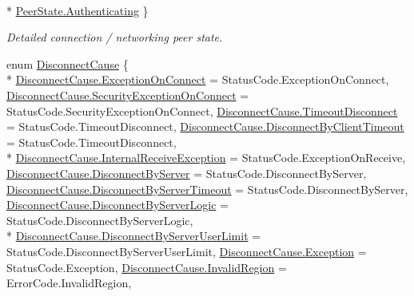 \begin{DoxyCompactItemize}
\\*
\hyperlink{group__public_api_gga91cc003c03acb26c6f1530440ebdbc88aedb214653d9f3cecd840463790ac2894}{Peer\+State.\+Authenticating}
 \}\begin{DoxyCompactList}\small\item\em Detailed connection / networking peer state. \end{DoxyCompactList}
\item 
enum \hyperlink{group__public_api_gad61b1461cf60ad9e8d86923d111d5cc9}{Disconnect\+Cause} \{ \\*
\hyperlink{group__public_api_ggad61b1461cf60ad9e8d86923d111d5cc9ae28f71975b160263c7e6438b4b4429ef}{Disconnect\+Cause.\+Exception\+On\+Connect} = Status\+Code.\+Exception\+On\+Connect, 
\hyperlink{group__public_api_ggad61b1461cf60ad9e8d86923d111d5cc9a281086f3f83f5f38b4b9a4572b60a368}{Disconnect\+Cause.\+Security\+Exception\+On\+Connect} = Status\+Code.\+Security\+Exception\+On\+Connect, 
\hyperlink{group__public_api_ggad61b1461cf60ad9e8d86923d111d5cc9ad376a854099d47f8a5279893e854ec27}{Disconnect\+Cause.\+Timeout\+Disconnect} = Status\+Code.\+Timeout\+Disconnect, 
\hyperlink{group__public_api_ggad61b1461cf60ad9e8d86923d111d5cc9a9b962f813e1575d4d311a9ab3e60afd4}{Disconnect\+Cause.\+Disconnect\+By\+Client\+Timeout} = Status\+Code.\+Timeout\+Disconnect, 
\\*
\hyperlink{group__public_api_ggad61b1461cf60ad9e8d86923d111d5cc9a927b48448e5111f5bac2a7d59833f051}{Disconnect\+Cause.\+Internal\+Receive\+Exception} = Status\+Code.\+Exception\+On\+Receive, 
\hyperlink{group__public_api_ggad61b1461cf60ad9e8d86923d111d5cc9a0777deff381bd76ec1ab2dc434860022}{Disconnect\+Cause.\+Disconnect\+By\+Server} = Status\+Code.\+Disconnect\+By\+Server, 
\hyperlink{group__public_api_ggad61b1461cf60ad9e8d86923d111d5cc9a354c849d41c85993a8a28975e0d1c996}{Disconnect\+Cause.\+Disconnect\+By\+Server\+Timeout} = Status\+Code.\+Disconnect\+By\+Server, 
\hyperlink{group__public_api_ggad61b1461cf60ad9e8d86923d111d5cc9abbec862190460d01acb3557a0e9a13f5}{Disconnect\+Cause.\+Disconnect\+By\+Server\+Logic} = Status\+Code.\+Disconnect\+By\+Server\+Logic, 
\\*
\hyperlink{group__public_api_ggad61b1461cf60ad9e8d86923d111d5cc9a443ec8de9a697e190f4b24ab3ab36a9d}{Disconnect\+Cause.\+Disconnect\+By\+Server\+User\+Limit} = Status\+Code.\+Disconnect\+By\+Server\+User\+Limit, 
\hyperlink{group__public_api_ggad61b1461cf60ad9e8d86923d111d5cc9ab0d4998a26f5b5742ad38c4af8817e32}{Disconnect\+Cause.\+Exception} = Status\+Code.\+Exception, 
\hyperlink{group__public_api_ggad61b1461cf60ad9e8d86923d111d5cc9aa8534012cb63e62c0b3a2335206117cc}{Disconnect\+Cause.\+Invalid\+Region} = Error\+Code.\+Invalid\+Region, 

\end{DoxyCompactItemize}
